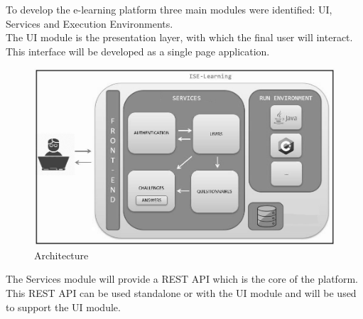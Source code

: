 To develop the e-learning platform three main modules were identified: UI, Services and Execution Environments.
\\
The UI module is the presentation layer, with which the final user will interact. This interface will be developed as a single page application.
\\
	\begin{figure}
  		\includegraphics[scale=0.6]{./imgs/arquitectura.JPG}
  		\caption{Architecture}
  		\label{fig:architecture}
	\end{figure} 
The Services module will provide a REST API which is the core of the platform.
\\
This REST API can be used standalone or with the UI module and will be used to support the UI module. 

\\
